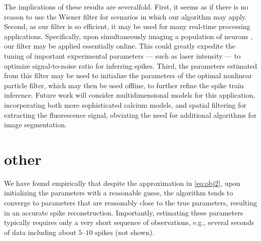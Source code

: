 The implications of these results are severalfold.  First, it seems as if there is no reason to use the Wiener filter for scenarios in which our algorithm may apply.  Second, as our filter is so efficient, it may be used for many real-time processing applications.  Specifically, upon simultaneously imaging a population of neurons \cite{IkegayaYuste04, NiellSmith05, OhkiReid05, YaksiFriedrich06, SatoSvoboda07}, our filter may be applied essentially online.  This could greatly expedite the tuning of important experimental parameters --- such as laser intensity --- to optimize signal-to-noise ratio for inferring spikes.  Third, the parameters estimated from this filter may be used to initialize the parameters of the optimal nonlinear particle filter, which may then be used offline, to further refine the spike train inference. %
Future work will consider multidimensional models for this application, incorporating both more sophisticated calcium models, and spatial filtering for extracting the fluorescence signal, obviating the need for additional algorithms for image segmentation. 

\section{other}

We have found empirically that despite the approximation in \eqref{eq:obj2}, upon initializing the parameters with a reasonable guess, the algorithm tends to converge to parameters that are reasonably close to the true parameters, resulting in an accurate spike reconstruction. Importantly, estimating these parameters typically requires only a very short sequence of observations, e.g., several seconds of data including about $5$--$10$ spikes (not shown).



